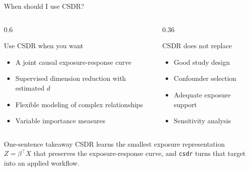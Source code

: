 \documentclass[
  ignorenonframetext,
  aspectratio=169,
  11pt]{beamer}
\providecommand{\tightlist}{%
  \setlength{\itemsep}{0pt}\setlength{\parskip}{0pt}}\usepackage{longtable,booktabs,array}
\begin{document}
\begin{frame}[fragile]{When should I use CSDR?}
\label{when-should-i-use-csdr}
\begin{columns}[T]
\begin{column}{0.6\linewidth}
\begin{block}{Use CSDR when you want}
\label{use-csdr-when-you-want}
\begin{itemize}
\tightlist
\item
  A joint causal exposure-response curve
\item
  Supervised dimension reduction with estimated \(d\)
\item
  Flexible modeling of complex relationships
\item
  Variable importance measures
\end{itemize}
\end{block}
\end{column}

\begin{column}{0.36\linewidth}
\begin{block}{CSDR does not replace}
\label{csdr-does-not-replace}
\begin{itemize}
\tightlist
\item
  Good study design
\item
  Confounder selection
\item
  Adequate exposure support
\item
  Sensitivity analysis
\end{itemize}
\end{block}
\end{column}
\end{columns}

\pause

\begin{alertblock}{One-sentence takeaway}
\label{one-sentence-takeaway}
CSDR learns the smallest exposure representation \(Z=\beta^\top X\) that
preserves the exposure-response curve, and \texttt{csdr} turns that
target into an applied workflow.
\end{alertblock}
\end{frame}
\end{document}
